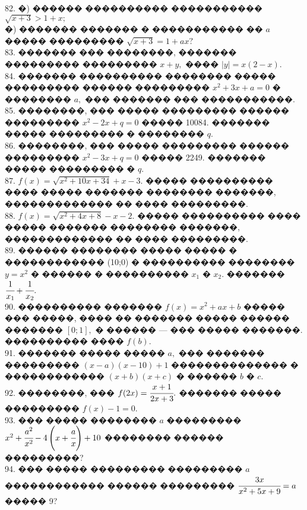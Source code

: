 \documentclass[12pt]{article}
\begin{document}
82. �) ������ ���������� ����������� $\sqrt{x+3}>1+x;$\\
�) ������� ������� � ����������� ��  $a$ ����� ��������� $\sqrt{x+3}=1+ax?$\\
83. ������� ��� ��������, ������� ��������� ��������� $x+y,$ ���� $|y|=x(2-x).$\\
84. ������� ���������� �������� ����� ��������� ������ ��������� $x^2+3x+a=0$ � �������� $a,$ ��� ������� ��� �����������.\\
85. ��������, ��� ����� ��������� ������ ��������� $x^2-2x + q = 0$ ����� 10084.
������� ����� ��������� � �������� $q.$\\
86. ��������, ��� ����� ��������� ������ ��������� $x^2 -3x + q = 0$ ����� 2249.
������� ����� ��������� � $q.$\\
87. $f(x)=\sqrt{x^2+10x+34}+x-3.$ ����� ���������� ���� ����� ������� �������� �������,
������������� �� ���� ���������.\\
88. $f(x)=\sqrt{x^2+4x+8}-x-2.$ ����� ���������� ���� ����� ������� �������� �������,
������������� �� ���� ���������.\\
89. ������ �������� ����� ����� � ������������ (10;0) � ���������� �������� $y=x^2$ � ������ � ���������� $x_1$ � $x_2.$ ������� $\cfrac{1}{x_1}+\cfrac{1}{x_2}.$\\
90. ���������� ������� $f(x)=x^2+ax+b$ ����� ��� �����, ���� �� ������� ����� ������ �������  $[0;1],$ �
������ --- ��� ����� �������. ���������� ���� $f(b).$\\
91. ������� ����� �����  $a,$ ��� ������� ���������  $(x-a)(x-10)+1$ �������������� � ������������ $(x+b)(x+c)$ � ������  $b$ �  $c.$\\
92. ��������, ��� $f(2x)=\cfrac{x+1}{2x+3}.$ ������� ����� ��������� $f(x)-1=0.$\\
93. ��� ����� �������� $a$ ��������� $x^2+\cfrac{a^2}{x^2}-4\left(x+\cfrac{a}{x}\right)+10$ �������� ������ ���������?\\
94. ��� ����� ��������� ��������� $a$ ������������ ������ ��������� $\cfrac{3x}{x^2+5x+9}=a$ ����� 9?
\newpage
\end{document}
